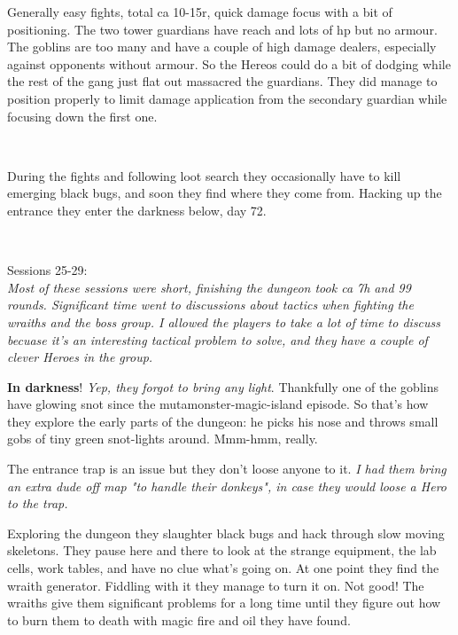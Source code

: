 Generally easy fights, total ca 10-15r, quick damage focus with a bit of positioning. The two tower guardians have reach and lots of hp but no armour. The goblins are too many and have a couple of high damage dealers, especially against opponents without armour. So the Hereos could do a bit of dodging while the rest of the gang just flat out massacred the guardians. They did manage to position properly to limit damage application from the secondary guardian while focusing down the first one.

\

During the fights and following loot search they occasionally have to kill emerging black bugs, and soon they find where they come from. Hacking up the entrance they enter the darkness below, day 72.

\


Sessions 25-29:\\                                                       %
\textit{Most of these sessions were short, finishing the dungeon took ca 7h and 99 rounds. Significant time went to discussions about tactics when fighting the wraiths and the boss group. I allowed the players to take a lot of time to discuss becuase it's an interesting tactical problem to solve, and they have a couple of clever Heroes in the group.}

\textbf{In darkness}! \emph{Yep, they forgot to bring any light}. Thankfully one of the goblins have glowing snot since the mutamonster-magic-island episode. So that's how they explore the early parts of the dungeon: he picks his nose and throws small gobs of tiny green snot-lights around. Mmm-hmm, really.

The entrance trap is an issue but they don't loose anyone to it. \textit{I had them bring an extra dude off map "to handle their donkeys", in case they would loose a Hero to the trap.}

Exploring the dungeon they slaughter black bugs and hack through slow moving skeletons. They pause here and there to look at the strange equipment, the lab cells, work tables, and have no clue what's going on.
At one point they find the wraith generator. Fiddling with it they manage to turn it on. Not good! The wraiths give them significant problems for a long time until they figure out how to burn them to death with magic fire and oil they have found.

